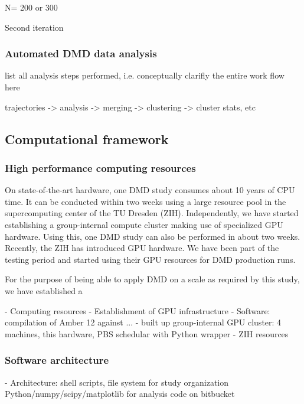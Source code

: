 N= 200 or 300


Second iteration


\subsubsection{Automated DMD data analysis}

 list all analysis steps performed, i.e. conceptually clarifly the entire
 work flow here

 trajectories -> analysis -> merging -> clustering -> cluster stats, etc


\subsection{Computational framework}

\subsubsection{High performance computing resources}


 On state-of-the-art hardware, one
DMD study consumes about 10 years of CPU time. It can be conducted within two
weeks using a large resource pool in the supercomputing center of the TU Dresden (ZIH).
Independently, we have started establishing a group-internal compute cluster making
use of specialized GPU hardware. Using this, one DMD study can also be performed
in about two weeks. Recently, the ZIH has introduced GPU hardware. We have been
part of the testing period and started using their GPU resources for DMD production
runs.

For the purpose of being able to apply DMD on a scale as required by this study,
we have established a

        - Computing resources
            - Establishment of GPU infrastructure
                - Software: compilation of Amber 12 against ...
                - built up group-internal GPU cluster:
                    4 machines, this hardware, PBS schedular with Python wrapper
                - ZIH resources

\subsubsection{Software architecture}

        - Architecture:
            shell scripts, file system for study organization
            Python/numpy/scipy/matplotlib for analysis
            code on bitbucket



